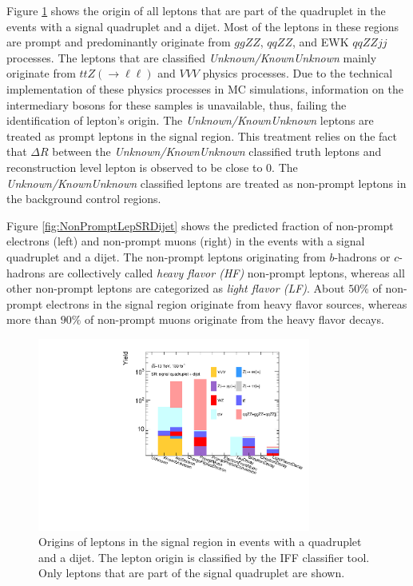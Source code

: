 Figure \ref{fig:LeptonCompositionSRVBS} shows the origin of all leptons that are part of the quadruplet in the events with a signal quadruplet and a dijet. Most of the leptons in these regions are prompt and predominantly originate from $ggZZ$, $qqZZ$, and EWK $qqZZjj$ processes. The leptons that are classified \textit{Unknown/KnownUnknown} mainly originate from $ttZ(\rightarrow \ell \ell)$ and $VVV$ physics processes. Due to the technical implementation of these physics processes in MC simulations, information on the intermediary bosons for these samples is unavailable, thus, failing the identification of lepton's origin. The \textit{Unknown/KnownUnknown} leptons are treated as prompt leptons in the signal region. This treatment relies on the fact that $\Delta R$ between the \textit{Unknown/KnownUnknown} classified truth leptons and reconstruction level lepton is observed to be close to $0$. The \textit{Unknown/KnownUnknown} classified leptons are treated as non-prompt leptons in the background control regions. 

Figure \ref{fig:NonPromptLepSRDijet} shows the predicted fraction of non-prompt electrons (left) and non-prompt muons (right) in the events with a signal quadruplet and a dijet. The non-prompt leptons originating from $b$-hadrons or $c$-hadrons are collectively called \textit{heavy flavor (HF)} non-prompt leptons, whereas all other non-prompt leptons are categorized as \textit{light flavor (LF)}. About $50\%$ of non-prompt electrons in the signal region originate from heavy flavor sources, whereas more than $90\%$ of non-prompt muons originate from the heavy flavor decays.

\begin{figure}[!htbp]
    \centering
    \includegraphics[width = 0.8\textwidth]{figures/Analysis/Background/AllLeptonSRDijetComposition.pdf}
    \caption{ Origins of leptons in the signal region in events with a quadruplet and a dijet. The lepton origin is classified by the IFF classifier tool. Only leptons that are part of the signal quadruplet are shown.\label{fig:LeptonCompositionSRVBS}}
\end{figure}

